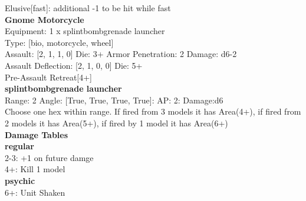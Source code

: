 Elusive[fast]: additional -1 to be hit while fast\\ 


{\bf Gnome Motorcycle } \\
Equipment: 1 x splintbombgrenade launcher \\
Type: [bio, motorcycle, wheel] \\

Assault: [2, 1, 1, 0] Die: 3+ Armor Penetration: 2 Damage: d6-2 \\
Assault Deflection: [2, 1, 0, 0] Die: 5+\\
\indent Pre-Assault Retreat[4+]\\ 
 



{\bf splintbombgrenade launcher } \\



Range: 2  Angle: [True, True, True, True]: AP: 2: Damage:d6 \\
Choose one hex within range. If fired from 3 models it has Area(4+), if fired from 2 models it has Area(5+), if fired by 1 model it has Area(6+)\\ 




 





{\bf Damage Tables} \\
 {\bf regular } \\
2-3: +1 on future damge \\
4+: Kill 1 model \\
 {\bf psychic } \\
6+: Unit Shaken \\










\pagebreak
